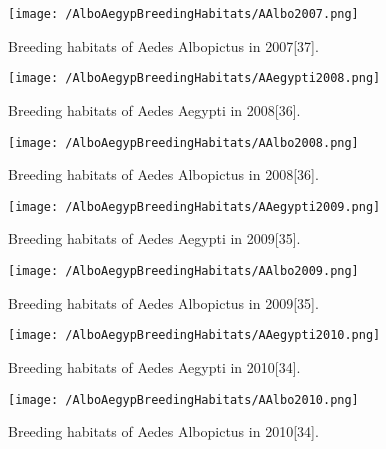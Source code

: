 \documentclass[11pt]{exam}
\begin{document}
\begin{questions}
\begin{enumerate}
\begin{figure}[H]
  \centering
   \texttt{[image: /AlboAegypBreedingHabitats/AAlbo2007.png]} 
  \caption{Breeding habitats of Aedes Albopictus in 2007[37].}
   \label{Breeding habitats of Aedes mosquitoes}
\end{figure} 

\newpage
\begin{figure}[H]
  \centering
   \texttt{[image: /AlboAegypBreedingHabitats/AAegypti2008.png]} 
  \caption{Breeding habitats of Aedes Aegypti in 2008[36].}
   \label{Breeding habitats of Aedes mosquitoes}
\end{figure} 

\begin{figure}[H]
  \centering
   \texttt{[image: /AlboAegypBreedingHabitats/AAlbo2008.png]} 
  \caption{Breeding habitats of Aedes Albopictus in 2008[36].}
   \label{Breeding habitats of Aedes mosquitoes}
\end{figure} 

\newpage
\begin{figure}[H]
  \centering
   \texttt{[image: /AlboAegypBreedingHabitats/AAegypti2009.png]} 
  \caption{Breeding habitats of Aedes Aegypti in 2009[35].}
   \label{Breeding habitats of Aedes mosquitoes}
\end{figure} 

\begin{figure}[H]
  \centering
   \texttt{[image: /AlboAegypBreedingHabitats/AAlbo2009.png]} 
  \caption{Breeding habitats of Aedes Albopictus in 2009[35].}
   \label{Breeding habitats of Aedes mosquitoes}
\end{figure} 

\newpage
\begin{figure}[H]
  \centering
   \texttt{[image: /AlboAegypBreedingHabitats/AAegypti2010.png]} 
  \caption{Breeding habitats of Aedes Aegypti in 2010[34].}
   \label{Breeding habitats of Aedes mosquitoes}
\end{figure} 

\begin{figure}[H]
  \centering
   \texttt{[image: /AlboAegypBreedingHabitats/AAlbo2010.png]} 
  \caption{Breeding habitats of Aedes Albopictus in 2010[34].}
   \label{Breeding habitats of Aedes mosquitoes}
\end{figure} 


\end{enumerate}
\end{questions}
\end{document}
